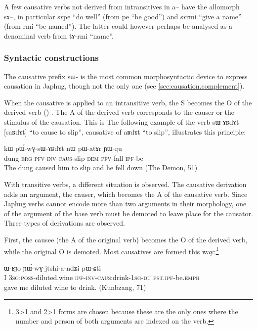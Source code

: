 \documentclass[oldfontcommands,oneside,a4paper,11pt]{memoir}
\newcommand{\ipa}[1]{{\phon #1}} %
\newcommand{\jg}[1]{\ipa{#1}\index{Japhug #1}}
\newcommand{\caus}{\textsc{caus}}
\newcommand{\dem}{\textsc{dem}}
\newcommand{\du}{\textsc{du}}
\newcommand{\erg}{\textsc{erg}}
\newcommand{\emphat}{\textsc{emph}}
\newcommand{\inv}{\textsc{inv}}
\newcommand{\ipf}{\textsc{ipf}}
\newcommand{\pfv}{\textsc{pfv}}
\newcommand{\poss}{\textsc{poss}}
\newcommand{\pst}{\textsc{pst}}
\newcommand{\sg}{\textsc{sg}}
\begin{document}
A few causative verbs not derived from intransitives in \ipa{a}-- have the allomorph \ipa{sɤ}--, in particular \ipa{sɤpe} ``do well'' (from \ipa{pe} ``be good'') and \ipa{sɤrmi} ``give a name'' (from \ipa{rmi} ``be named''). The latter could however perhaps be analysed as a denominal verb from \ipa{tɤ-rmi} ``name''.


\subsubsection{Syntactic constructions} \label{subsub:causation}
The causative prefix \ipa{sɯ-} is the most common morphosyntactic device to express causation in Japhug, though not the only one (see \ref{sec:causation.complement}).

When the causative is applied to an intransitive verb, the S becomes the O of the derived verb (\citet[45]{dixon00causative}) . The A of the derived verb corresponds to the causer  or the stimulus of the causation. This is The following example of the verb \jg{sɯ-ɤʁdɤt} [saʁdɤt] ``to cause to slip'', causative of \jg{aʁdɤt} ``to slip'', illustrates this principle:
\begin{exe}
\ex
\gll \ipa{tɯqe} 	\ipa{kɯ} 	\ipa{pɯ́-wɣ-sɯ-ɤʁdɤt} 	\ipa{nɯ} 	\ipa{pɯ-atɤr} 	\ipa{ɲɯ-ŋu} \\
dung \erg{} \pfv{}-\inv{}-\caus{}-slip \dem{} \pfv{}-fall \ipf{}-be \\
 \glt The dung caused him to slip and he fell down (The Demon, 51)
\end{exe} 



With transitive verbs, a different situation is observed. The causative derivation adds an argument, the causer, which becomes the A of the causative verb. Since Japhug verbs cannot encode more than two arguments in their morphology, one of the argument of the base verb must be demoted to leave place for the causator.  Three types of derivations are observed.

First, the causee (the A of the original verb) becomes the O of the derived verb, while the original O is demoted. Most causatives are formed this way:\footnote{3>1 and 2>1 forms are chosen because these are the only ones where the number and person of both arguments are indexed on the verb.}
 \begin{exe}
\ex
\gll  \ipa{aʑo} 	\ipa{ɯ-ʁɟo} 	\ipa{ɲɯ́-wɣ-jtshi-a-ndʑi} 	\ipa{pɯ-ɕti}  \\
  I 3\sg{}:\poss{}-diluted.wine \ipf{}-\inv{}-\caus{}:drink-1\sg{}-\du{} \pst{}.\ipf{}-be.\emphat{} \\
   gave me diluted wine to drink. (Kunbzang, 71)
\end{exe} 
 
\end{document}
